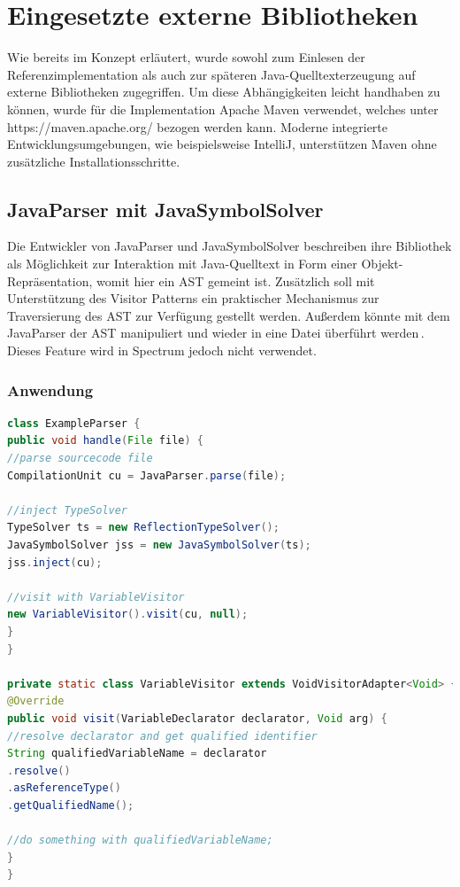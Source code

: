 \documentclass[12pt,oneside,a4paper,parskip]{scrbook}
\begin{document}
\section{Eingesetzte externe Bibliotheken}

Wie bereits im Konzept erläutert, wurde sowohl zum Einlesen der Referenzimplementation als auch zur späteren Java-Quelltexterzeugung auf externe Bibliotheken zugegriffen. Um diese Abhängigkeiten leicht handhaben zu können, wurde für die Implementation Apache Maven verwendet, welches unter https://maven.apache.org/ bezogen werden kann. Moderne integrierte Entwicklungsumgebungen, wie beispielsweise IntelliJ, unterstützen Maven ohne zusätzliche Installationsschritte.

\subsection{JavaParser mit JavaSymbolSolver}

Die Entwickler von JavaParser und JavaSymbolSolver beschreiben ihre Bibliothek als Möglichkeit zur Interaktion mit Java-Quelltext in Form einer Objekt-Repräsentation, womit hier ein AST gemeint ist. Zusätzlich soll mit Unterstützung des Visitor Patterns ein praktischer Mechanismus zur Traversierung des AST zur Verfügung gestellt werden. Außerdem könnte mit dem JavaParser der AST manipuliert und wieder in eine Datei überführt werden\,\cite[S. 1]{javaparser2017}. Dieses Feature wird in Spectrum jedoch nicht verwendet.

\subsubsection{Anwendung}

\begin{lstlisting}[label=lst:jpVisit,
language=java,
firstnumber=1,
caption=Beispielhafte Initialisierung und Verwendung des JavaParsers und des JavaSymbolSolvers]
class ExampleParser {
public void handle(File file) {
//parse sourcecode file
CompilationUnit cu = JavaParser.parse(file);

//inject TypeSolver
TypeSolver ts = new ReflectionTypeSolver();
JavaSymbolSolver jss = new JavaSymbolSolver(ts);
jss.inject(cu);

//visit with VariableVisitor
new VariableVisitor().visit(cu, null);
}
}

private static class VariableVisitor extends VoidVisitorAdapter<Void> {
@Override
public void visit(VariableDeclarator declarator, Void arg) {
//resolve declarator and get qualified identifier
String qualifiedVariableName = declarator
.resolve()
.asReferenceType()
.getQualifiedName();

//do something with qualifiedVariableName;
}
}
\end{lstlisting}
\end{document}
